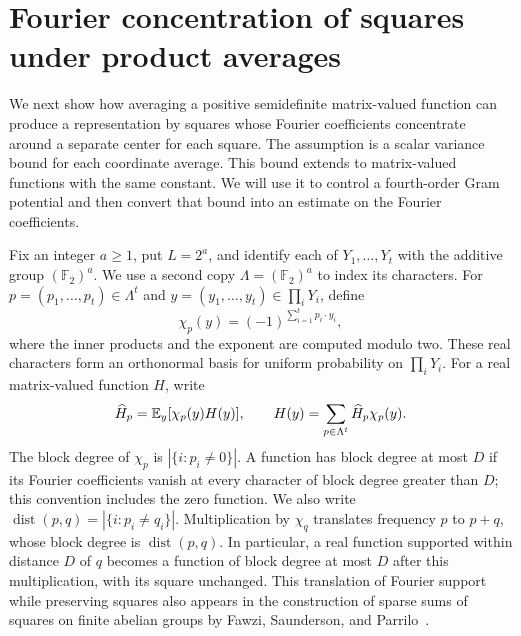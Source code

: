 \section{Fourier concentration of squares under product averages}
\label{sec:fourier}

We next show how averaging a positive semidefinite matrix-valued
function can produce a representation by squares whose Fourier
coefficients concentrate around a separate center for each square.
The assumption is a scalar variance bound for each coordinate average.
This bound extends to matrix-valued functions with the same constant.
We will use it to control a fourth-order Gram potential and then
convert that bound into an estimate on the Fourier coefficients.

Fix an integer $a\ge1$, put $L=2^a$, and identify each of
$Y_1,\ldots,Y_t$ with the additive group $(\mathbb F_2)^a$.
We use a second copy $\Lambda=(\mathbb F_2)^a$ to index its characters.
For $p=(p_1,\ldots,p_t)\in\Lambda^t$ and
$y=(y_1,\ldots,y_t)\in\prod_iY_i$, define
\[
  \chi_p(y)=(-1)^{\sum_{i=1}^t p_i\cdot y_i},
\]
where the inner products and the exponent are computed modulo two.
These real characters form an orthonormal basis for uniform probability
on $\prod_iY_i$.  For a real matrix-valued function $H$, write
\[
  \widehat H_p=\mathbb E_y[\chi_p(y)H(y)],
  \qquad H(y)=\sum_{p\in\Lambda^t}\widehat H_p\chi_p(y).
\]
The block degree of $\chi_p$ is $|\{i:p_i\ne0\}|$.
A function has block degree at most $D$ if its Fourier coefficients
vanish at every character of block degree greater than $D$; this
convention includes the zero function.
We also write
$\operatorname{dist}(p,q)=|\{i:p_i\ne q_i\}|$.
Multiplication by $\chi_q$ translates frequency $p$ to $p+q$, whose
block degree is $\operatorname{dist}(p,q)$.  In particular, a real
function supported within distance $D$ of $q$ becomes a function of
block degree at most $D$ after this multiplication, with its square
unchanged.  This translation of Fourier support while preserving
squares also appears in the construction of sparse sums of squares
on finite abelian groups by Fawzi, Saunderson, and
Parrilo~\cite{fsp-sparse}.

